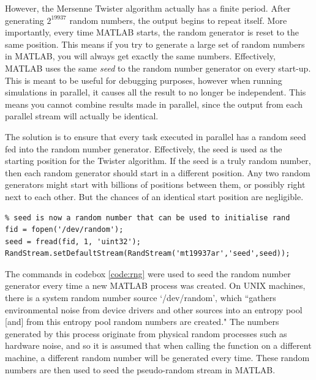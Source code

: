 \documentclass[11pt]{article}
\numberwithin{equation}{subsection}
\begin{document}
However, the Mersenne Twister algorithm actually has a finite period. After generating $2^{19937}$ random numbers, the output begins to repeat itself. More importantly, every time MATLAB starts, the random generator is reset to the same position. This means if you try to generate a large set of random numbers in MATLAB, you will always get exactly the same numbers. Effectively, MATLAB uses the same \textit{seed} to the random number generator on every start-up. This is meant to be useful for debugging purposes, however when running simulations in parallel, it causes all the result to no longer be independent. This means you cannot combine results made in parallel, since the output from each parallel stream will actually be identical.

The solution is to ensure that every task executed in parallel has a random seed fed into the random number generator. Effectively, the seed is used as the starting position for the Twister algorithm. If the seed is a truly random number, then each random generator should start in a different position. Any two random generators might start with billions of positions between them, or possibly right next to each other. But the chances of an identical start position are negligible.

\begin{lstlisting}[float=ht,style=Matlab-editor,caption = {Seeding random generator},label=code:rng]
% Ensures truly random numbers for each process
% seed is now a random number that can be used to initialise rand
fid = fopen('/dev/random');
seed = fread(fid, 1, 'uint32');
RandStream.setDefaultStream(RandStream('mt19937ar','seed',seed));
\end{lstlisting}

The commands in codebox \ref{code:rng} were used to seed the random number generator every time a new MATLAB process was created. On UNIX machines, there is a system random number source \mbox{`/dev/random'}, which ``gathers environmental noise from device drivers and other sources into an entropy pool [and] from this entropy pool random numbers are created." The numbers generated by this process originate from physical random processes such as hardware noise, and so it is assumed that when calling the function on a different machine, a different random number will be generated every time. These random numbers are then used to seed the pseudo-random stream in MATLAB. 
\end{document}
